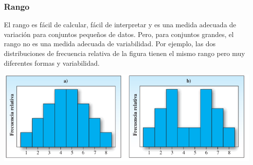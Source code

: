 \documentclass[spanish]{beamer}
\begin{document}
\begin{frame}
\frametitle{Rango}
El rango es fácil de calcular, fácil de interpretar
y es una medida adecuada de variación para conjuntos pequeños de datos. Pero, para conjuntos grandes, el rango no es una medida adecuada de variabilidad. Por ejemplo, las dos distribuciones de frecuencia relativa de la figura tienen el mismo rango pero muy diferentes formas y variabilidad.
\begin{center}
\includegraphics[width=\textwidth]{im12}
\end{center}
\end{frame}
\end{document}
